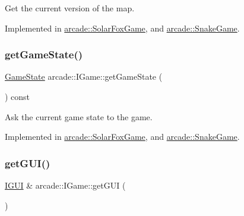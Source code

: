 Get the current version of the map. 



Implemented in \hyperlink{classarcade_1_1_solar_fox_game_a8bb422466d4367320e90c6f9c6b754ed}{arcade\+::\+Solar\+Fox\+Game}, and \hyperlink{classarcade_1_1_snake_game_abc3fe4beaa1d2b7df8573f3375cbd4cb}{arcade\+::\+Snake\+Game}.

\mbox{\label{classarcade_1_1_i_game_a75083f0465c0ccbdbbb38c689b4a694c}} 
\subsubsection{\texorpdfstring{get\+Game\+State()}{getGameState()}}
{\footnotesize\ttfamily \hyperlink{namespacearcade_a6adca89ee2f539b03980c7e59b044ed7}{Game\+State} arcade\+::\+I\+Game\+::get\+Game\+State (\begin{DoxyParamCaption}{ }\end{DoxyParamCaption}) const\hspace{0.3cm}{\ttfamily [pure virtual]}}



Ask the current game state to the game. 



Implemented in \hyperlink{classarcade_1_1_solar_fox_game_a71122936c223e672058280755f24a98a}{arcade\+::\+Solar\+Fox\+Game}, and \hyperlink{classarcade_1_1_snake_game_afcd7d113f2187cd34396022af4e9e10c}{arcade\+::\+Snake\+Game}.

\mbox{\label{classarcade_1_1_i_game_abe849a6ed370a18de51bc8cb7a2329ba}} 
\subsubsection{\texorpdfstring{get\+G\+U\+I()}{getGUI()}}
{\footnotesize\ttfamily \hyperlink{classarcade_1_1_i_g_u_i}{I\+G\+UI} \& arcade\+::\+I\+Game\+::get\+G\+UI (\begin{DoxyParamCaption}{ }\end{DoxyParamCaption})\hspace{0.3cm}{\ttfamily [pure virtual]}}



